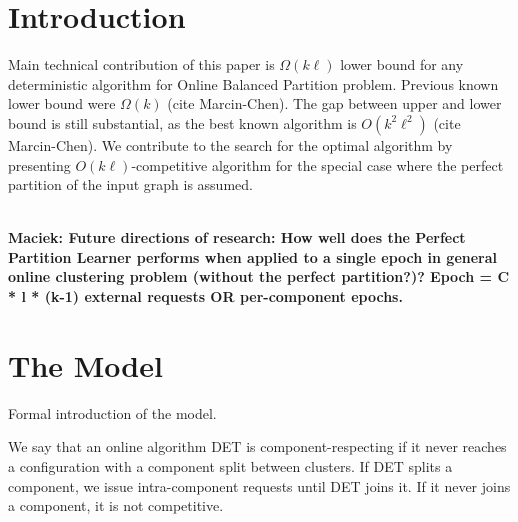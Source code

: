 \documentclass[conference]{IEEEtran}
\newcommand\maciek[1]{\color{brown}\textbf{\\ Maciek: #1}\color{black}}
\begin{document}
\section{Introduction}

Main technical contribution of this paper is $\Omega(k\ell)$ lower bound for any deterministic algorithm for Online Balanced Partition problem.
Previous known lower bound were $\Omega(k)$ (cite Marcin-Chen).
The gap between upper and lower bound is still substantial, as the best known algorithm is $O(k^2\ell^2)$ (cite Marcin-Chen).
We contribute to the search for the optimal algorithm by presenting $O(k\ell)$-competitive algorithm for the special case where the perfect partition of the input graph is assumed.

\maciek{Future directions of research: How well does the Perfect Partition Learner performs when applied to a single epoch in general online clustering problem (without the perfect partition?)? Epoch = C * l * (k-1) external requests OR per-component epochs.}

\section{The Model}

Formal introduction of the model.

 We say that an online algorithm DET is component-respecting if it never reaches a configuration with a component split between clusters.
 If DET splits a component, we issue intra-component requests until DET joins it.
 If it never joins a component, it is not competitive.
 




\appendix


	
\end{document}
